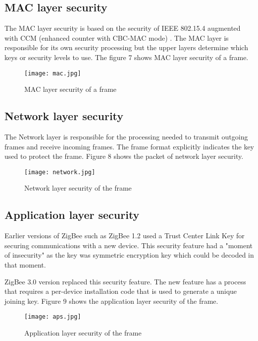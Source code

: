 \documentclass[conference]{IEEEtran}
\begin{document}
\subsection{MAC layer security}

The MAC layer security is based on the security of IEEE 802.15.4 augmented with CCM (enhanced counter with CBC-MAC mode) .  The MAC layer is responsible for its own security processing but the upper layers determine which keys or security levels to use. The figure 7 shows MAC layer security of a frame.\cite{Security_Analysis}

\begin{figure}
    \centering
    \texttt{[image: mac.jpg]}
    \caption{MAC layer security of a frame\cite{Security_Analysis}}
    \label{MAC layer security of a frame}
\end{figure}

\subsection{Network layer security}
The Network layer is responsible for the processing needed to transmit outgoing frames and receive incoming frames. The frame format explicitly indicates the key used to protect the frame. Figure 8 shows the packet of network layer security.\cite{Security_Analysis}
\begin{figure}
    \centering
    \texttt{[image: network.jpg]}
    \caption{Network layer security of the frame\cite{Security_Analysis}}
    \label{Network layer security of the frame}
\end{figure}
\subsection{Application layer security}
Earlier versions of ZigBee such as ZigBee 1.2 used a Trust Center Link Key for securing communications with a new device. This security feature had a "moment of insecurity" as the key was symmetric encryption key which could be decoded in that moment.

ZigBee 3.0 version replaced this security feature. The new feature has a process that requires a per-device installation code that is used to generate a unique joining key. Figure 9 shows the application layer security of the frame.\cite{Security_Analysis}
\begin{figure}
    \centering
    \texttt{[image: aps.jpg]}
    \caption{Application layer security of the frame\cite{Security_Analysis}}
    \label{Application layer security of the frame}
\end{figure}
\end{document}
